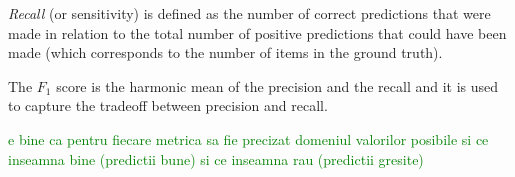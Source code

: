 \textit{Recall} (or sensitivity) is defined as the number of correct
predictions that were made in relation to the total number of positive
predictions that could have been made (which corresponds to the number of
items in the ground truth).

The \textit{$F_1$} score is the harmonic mean of the precision and the
recall and it is used to capture the tradeoff between precision and
recall\cite{hitesh2012}.

\textcolor{green}{e bine ca pentru fiecare metrica sa fie precizat domeniul valorilor posibile si ce inseamna bine (predictii bune) si ce inseamna rau (predictii gresite)}
